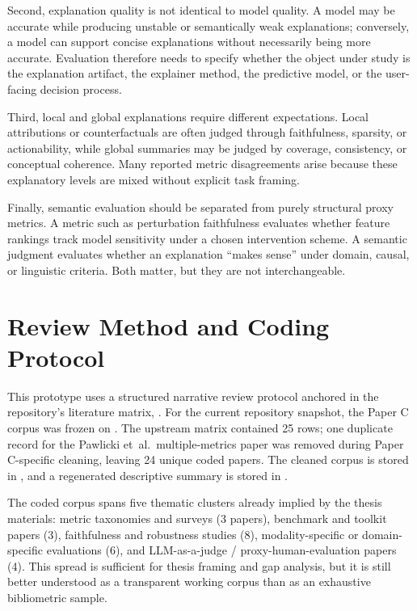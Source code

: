 \documentclass[twoside,11pt]{article}
\begin{document}
Second, explanation quality is not identical to model quality. A model
may be accurate while producing unstable or semantically weak
explanations; conversely, a model can support concise explanations
without necessarily being more accurate. Evaluation therefore needs to
specify whether the object under study is the explanation artifact, the
explainer method, the predictive model, or the user-facing decision
process.

Third, local and global explanations require different expectations.
Local attributions or counterfactuals are often judged through
faithfulness, sparsity, or actionability, while global summaries may be
judged by coverage, consistency, or conceptual coherence. Many reported
metric disagreements arise because these explanatory levels are mixed
without explicit task framing.

Finally, semantic evaluation should be separated from purely structural
proxy metrics. A metric such as perturbation faithfulness evaluates
whether feature rankings track model sensitivity under a chosen
intervention scheme. A semantic judgment evaluates whether an
explanation ``makes sense'' under domain, causal, or linguistic
criteria. Both matter, but they are not interchangeable.

\section{Review Method and Coding Protocol}

This prototype uses a structured narrative review protocol anchored in
the repository's literature matrix,
. For the
current repository snapshot, the Paper C corpus was frozen on
. The upstream matrix contained 25 rows; one duplicate
record for the Pawlicki et~al.\ multiple-metrics paper was removed
during Paper C-specific cleaning, leaving 24 unique coded papers. The
cleaned corpus is stored in
, and a regenerated
descriptive summary is stored in
.

The coded corpus spans five thematic clusters already implied by the
thesis materials: metric taxonomies and surveys (3 papers), benchmark
and toolkit papers (3), faithfulness and robustness studies (8),
modality-specific or domain-specific evaluations (6), and
LLM-as-a-judge / proxy-human-evaluation papers (4). This spread is
sufficient for thesis framing and gap analysis, but it is still better
understood as a transparent working corpus than as an exhaustive
bibliometric sample.
\end{document}
